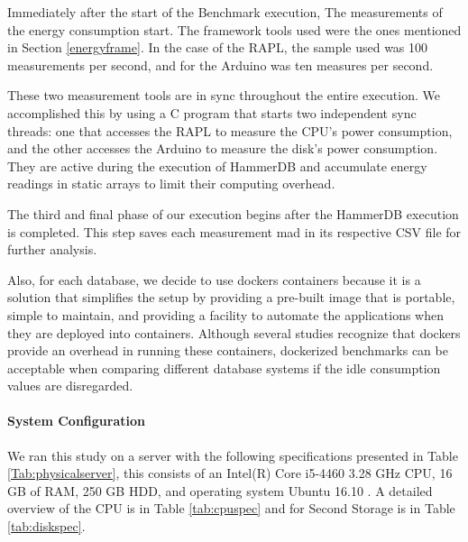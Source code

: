 
Immediately after the start of the Benchmark execution, The measurements of the energy consumption start. The framework tools used were the ones mentioned in Section \ref{energyframe}.  In the case of the RAPL, the sample used was 100 measurements per second, and for the Arduino was ten measures per second.


These two measurement tools are in sync throughout the entire execution. We accomplished this by using a C program that starts two independent sync threads: one that accesses the RAPL to measure the CPU's power consumption, and the other accesses the Arduino to measure the disk's power consumption. They are active during the execution of HammerDB and accumulate energy readings in static arrays to limit their computing overhead.



The third and final phase of our execution begins after the HammerDB execution is completed. This step saves each measurement mad in its respective CSV file for further analysis.





Also, for each database, we decide to use dockers containers because it is a solution that simplifies the setup by providing a pre-built image that is portable, simple to maintain, and providing a facility to automate the applications when they are deployed into containers\cite{rad2017introduction,10.1145/2723872.2723882}. Although several studies recognize that dockers provide an overhead in running these containers\cite{chung2016using,varghese2016container,impactDocker,felter2015updated}, dockerized benchmarks can be acceptable when comparing different database systems if the idle consumption values are disregarded\cite{grambow2019safe}.


\paragraph{System Configuration}

We ran this study on a server with the following specifications presented in Table  \ref{Tab:physicalserver}, this consists of an Intel(R) Core i5-4460 3.28 GHz CPU, 16 GB of RAM, 250 GB HDD, and operating system Ubuntu 16.10 . A detailed overview of the CPU is in Table \ref{tab:cpuspec} and for Second Storage is in Table \ref{tab:diskspec}.

